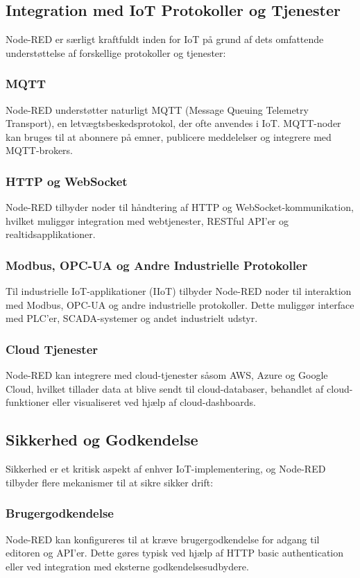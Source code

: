 \subsection{Integration med IoT Protokoller og Tjenester}
Node-RED er særligt kraftfuldt inden for IoT på grund af dets omfattende understøttelse af forskellige protokoller og tjenester:

\subsubsection{MQTT}
Node-RED understøtter naturligt MQTT (Message Queuing Telemetry Transport), en letvægtsbeskedsprotokol, der ofte anvendes i IoT. MQTT-noder kan bruges til at abonnere på emner, publicere meddelelser og integrere med MQTT-brokers.

\subsubsection{HTTP og WebSocket}
Node-RED tilbyder noder til håndtering af HTTP og WebSocket-kommunikation, hvilket muliggør integration med webtjenester, RESTful API'er og realtidsapplikationer.

\subsubsection{Modbus, OPC-UA og Andre Industrielle Protokoller}
Til industrielle IoT-applikationer (IIoT) tilbyder Node-RED noder til interaktion med Modbus, OPC-UA og andre industrielle protokoller. Dette muliggør interface med PLC'er, SCADA-systemer og andet industrielt udstyr.

\subsubsection{Cloud Tjenester}
Node-RED kan integrere med cloud-tjenester såsom AWS, Azure og Google Cloud, hvilket tillader data at blive sendt til cloud-databaser, behandlet af cloud-funktioner eller visualiseret ved hjælp af cloud-dashboards.

\subsection{Sikkerhed og Godkendelse}
Sikkerhed er et kritisk aspekt af enhver IoT-implementering, og Node-RED tilbyder flere mekanismer til at sikre sikker drift:

\subsubsection{Brugergodkendelse}
Node-RED kan konfigureres til at kræve brugergodkendelse for adgang til editoren og API'er. Dette gøres typisk ved hjælp af HTTP basic authentication eller ved integration med eksterne godkendelsesudbydere.

